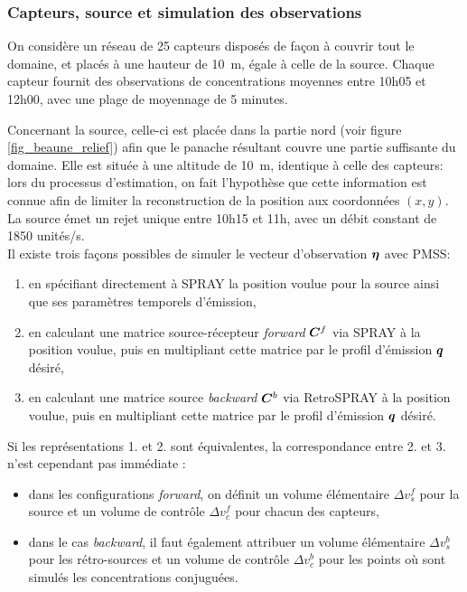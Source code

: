 \subsubsection{Capteurs, source et simulation des observations}
On considère un réseau de 25 capteurs disposés de façon à couvrir tout le domaine, et placés à une hauteur de \SI{10}{\meter}, égale à celle de la source. Chaque capteur fournit des observations de concentrations moyennes entre 10h05 et 12h00, avec une plage de moyennage de 5 minutes.

Concernant la source, celle-ci est placée dans la partie nord (voir figure \ref{fig_beaune_relief}) afin que le panache résultant couvre une partie suffisante du domaine. Elle est située à une altitude de \SI{10}{\m}, identique à celle des capteurs: lors du processus d'estimation, on fait l'hypothèse que cette information est connue afin de limiter la reconstruction de la position aux coordonnées $(x,y)$. La source émet un rejet unique entre 10h15 et 11h, avec un débit constant de 1850 unités/s. \\

Il existe trois façons possibles de simuler le vecteur d'observation ${\bm{\eta}}$ avec PMSS: 

\begin{enumerate}
	\item en spécifiant directement à SPRAY la position voulue pour la source ainsi que ses paramètres temporels d'émission,
	\item en calculant une matrice source-récepteur \textit{forward} ${\bm{C}}^f$ via SPRAY à la position voulue, puis en multipliant cette matrice par le profil d'émission ${\bm{q}}$ désiré,
	\item en calculant une matrice source \textit{backward} ${\bm{C}}^b$ via RetroSPRAY à la position voulue, puis en multipliant cette matrice par le profil d'émission ${\bm{q}}$ désiré.\\
	
\end{enumerate}

Si les représentations 1. et 2. sont équivalentes, la correspondance entre 2. et 3. n'est cependant pas immédiate : 

\begin{itemize}
	\item dans les configurations \textit{forward}, on définit un volume élémentaire $\Delta v_s^f$ pour la source et un volume de contrôle $\Delta v_c^f$ pour chacun des capteurs,
	\item dans le cas \textit{backward}, il faut également attribuer un volume élémentaire $\Delta v_s^b$ pour les rétro-sources et un volume de contrôle $\Delta v_c^b $ pour les points où sont simulés les concentrations conjuguées.\\
	
\end{itemize}

